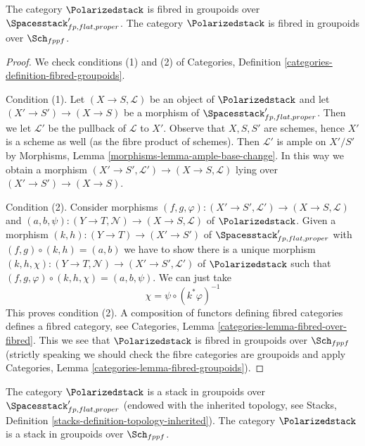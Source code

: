 \begin{lemma}
\label{lemma-polarized-fibred-in-groupoids}
The category $\Polarizedstack$ is fibred in groupoids over
$\Spacesstack'_{fp, flat, proper}$.
The category $\Polarizedstack$ is fibred in groupoids over $\Sch_{fppf}$.
\end{lemma}

\begin{proof}
We check conditions (1) and (2) of
Categories, Definition \ref{categories-definition-fibred-groupoids}.

\medskip\noindent
Condition (1). Let $(X \to S, \mathcal{L})$ be an object of
$\Polarizedstack$ and let $(X' \to S') \to (X \to S)$
be a morphism of $\Spacesstack'_{fp, flat, proper}$. Then we
let $\mathcal{L}'$ be the pullback of $\mathcal{L}$ to $X'$.
Observe that $X, S, S'$ are schemes, hence $X'$ is a scheme
as well (as the fibre product of schemes). Then
$\mathcal{L}'$ is ample on $X'/S'$ by
Morphisms, Lemma \ref{morphisms-lemma-ample-base-change}.
In this way we obtain a morphism
$(X' \to S', \mathcal{L}') \to (X \to S, \mathcal{L})$
lying over $(X' \to S') \to (X \to S)$.

\medskip\noindent
Condition (2). Consider morphisms
$(f, g, \varphi) : (X' \to S', \mathcal{L}') \to (X \to S, \mathcal{L})$ and
$(a, b, \psi) : (Y \to T, \mathcal{N}) \to (X \to S, \mathcal{L})$
of $\Polarizedstack$. Given a morphism $(k, h) : (Y \to T) \to (X' \to S')$
of $\Spacesstack'_{fp, flat, proper}$
with $(f, g) \circ (k, h) = (a, b)$ we have to show
there is a unique morphism
$(k, h, \chi) : (Y \to T, \mathcal{N}) \to (X' \to S', \mathcal{L}')$
of $\Polarizedstack$ such that
$(f, g, \varphi) \circ (k, h, \chi) = (a, b, \psi)$.
We can just take
$$
\chi = \psi \circ (k^*\varphi)^{-1}
$$
This proves condition (2). A composition of functors defining
fibred categories defines a fibred category, see
Categories, Lemma \ref{categories-lemma-fibred-over-fibred}.
This we see that $\Polarizedstack$ is fibred in groupoids over
$\Sch_{fppf}$ (strictly speaking we should check the fibre
categories are groupoids and apply
Categories, Lemma \ref{categories-lemma-fibred-groupoids}).
\end{proof}

\begin{lemma}
\label{lemma-polarized-stack}
The category $\Polarizedstack$ is a stack in groupoids over
$\Spacesstack'_{fp, flat, proper}$ (endowed with the inherited topology,
see Stacks, Definition \ref{stacks-definition-topology-inherited}).
The category $\Polarizedstack$ is a stack in groupoids over $\Sch_{fppf}$.
\end{lemma}

